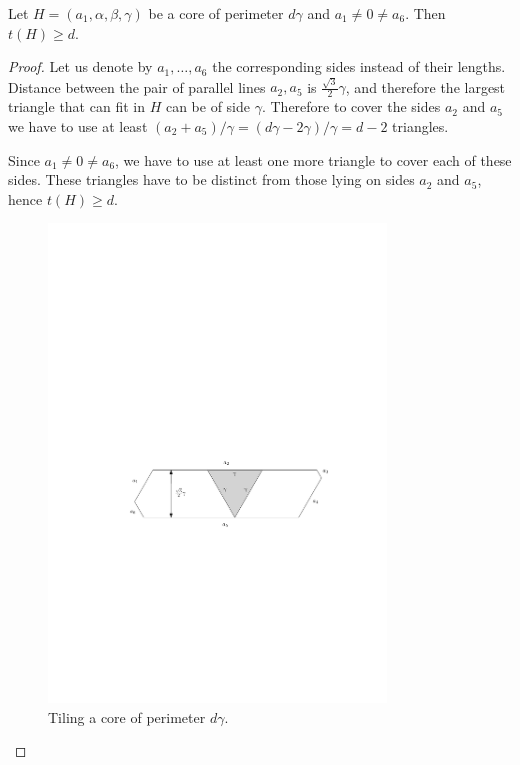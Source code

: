 \begin{lem}
\label{lem:core-dissection-bound}
Let $H = (a_1, \alpha, \beta, \gamma)$ be a core of perimeter $d\gamma$ and $a_1 \ne 0 \ne a_6$. Then $t(H) \geq d$.
\end{lem}
\begin{proof}
Let us denote by $a_1, \dots, a_6$ the corresponding sides instead of their lengths. Distance between the pair of parallel lines $a_2, a_5$ is $\frac{\sqrt{3}}{2}\gamma$, and therefore the largest triangle that can fit in $H$ can be of side $\gamma$. Therefore to cover the sides $a_2$ and $a_5$ we have to use at least $(a_2+a_5)/\gamma = (d\gamma-2\gamma)/\gamma = d-2$ triangles.

Since $a_1 \ne 0 \ne a_6$, we have to use at least one more triangle to cover each of these sides. These triangles have to be distinct from those lying on sides $a_2$ and $a_5$, hence $t(H) \geq d$.

\begin{figure}[htb]
\centering
\includegraphics[width=0.8\textwidth]{img/core_tiling_lower_bound.pdf}
\caption{Tiling a core of perimeter $d\gamma$.}
\label{fig:core-tiling-lower-bound}
\end{figure}\end{proof}

